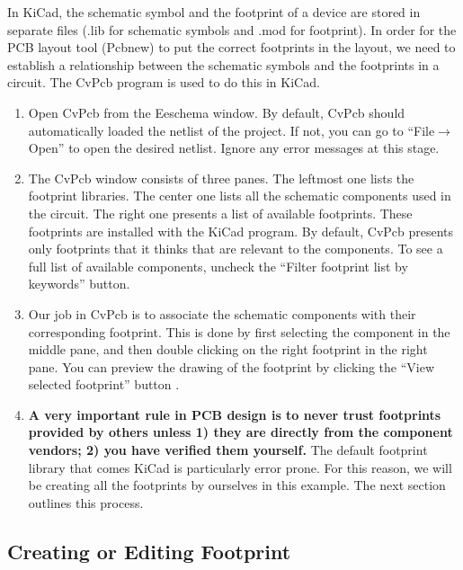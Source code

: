 \documentclass[12pt,letterpaper]{scrartcl}
\begin{document}
In KiCad, the schematic symbol and the footprint of a device are stored in separate files (.lib for schematic symbols and .mod for footprint). In order for the PCB layout tool (Pcbnew) to put the correct footprints in the layout, we need to establish a relationship between the schematic symbols and the footprints in a circuit. The CvPcb program is used to do this in KiCad. 

\begin{enumerate}
	\item Open CvPcb from the Eeschema window. By default, CvPcb should automatically loaded the netlist of the project. If not, you can go to ``File$\rightarrow$Open'' to open the desired netlist. Ignore any error messages at this stage.
	
	\item The CvPcb window consists of three panes. The leftmost one lists the footprint libraries. The center one lists all the schematic components used in the circuit. The right one presents a list of available footprints. These footprints are installed with the KiCad program. By default, CvPcb presents only footprints that it thinks that are relevant to the components. To see a full list of available components, uncheck the ``Filter footprint list by keywords'' button. 
	
	\item Our job in CvPcb is to associate the schematic components with their corresponding footprint. This is done by first selecting the component in the middle pane, and then double clicking on the right footprint in the right pane. You can preview the drawing of the footprint by clicking the ``View selected footprint'' button . 
	
	\item \textbf{A very important rule in PCB design is to never trust footprints provided by others unless 1) they are directly from the component vendors; 2) you have verified them yourself.} The default footprint library that comes KiCad is particularly error prone. For this reason, we will be creating all the footprints by ourselves in this example. The next section outlines this process. 
\end{enumerate}

\subsection{Creating or Editing Footprint}
\end{document}
